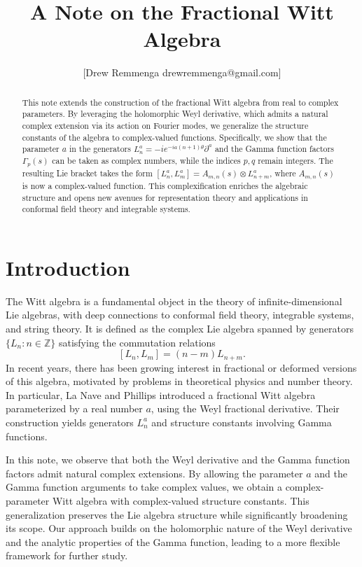 \documentclass{artjlt}
\title{A Note on the Fractional Witt Algebra}
\author{[Drew Remmenga drewremmenga@gmail.com]}
\newcommand{\?}{\textbackslash}
\begin{document}
\maketitle
\begin{abstract}
  This note extends the construction of the fractional Witt algebra from real to complex parameters. By leveraging the holomorphic Weyl derivative, which admits a natural complex extension via its action on Fourier modes, we generalize the structure constants of the algebra to complex-valued functions. Specifically, we show that the parameter $a$ in the generators $L_n^a = -ie^{-ia(n+1)\theta} \partial^a$ and the Gamma function factors $\Gamma_p(s)$ can be taken as complex numbers, while the indices $p, q$ remain integers. The resulting Lie bracket takes the form $[L_n^a, L_m^a] = A_{m,n}(s) \otimes L_{n+m}^a$, where $A_{m,n}(s)$ is now a complex-valued function. This complexification enriches the algebraic structure and opens new avenues for representation theory and applications in conformal field theory and integrable systems.
 \end{abstract}
\section{Introduction}
The Witt algebra is a fundamental object in the theory of infinite-dimensional Lie algebras, with deep connections to conformal field theory, integrable systems, and string theory. It is defined as the complex Lie algebra spanned by generators $\{L_n : n \in \mathbb{Z}\}$ satisfying the commutation relations
\[
[L_n, L_m] = (n - m)L_{n+m}.
\]
In recent years, there has been growing interest in fractional or deformed versions of this algebra, motivated by problems in theoretical physics and number theory. In particular, La Nave and Phillips \cite{LaNave2019} introduced a fractional Witt algebra parameterized by a real number $a$, using the Weyl fractional derivative. Their construction yields generators $L_n^a$ and structure constants involving Gamma functions. 

In this note, we observe that both the Weyl derivative and the Gamma function factors admit natural complex extensions. By allowing the parameter $a$ and the Gamma function arguments to take complex values, we obtain a complex-parameter Witt algebra with complex-valued structure constants. This generalization preserves the Lie algebra structure while significantly broadening its scope. Our approach builds on the holomorphic nature of the Weyl derivative and the analytic properties of the Gamma function, leading to a more flexible framework for further study.
\end{document}
